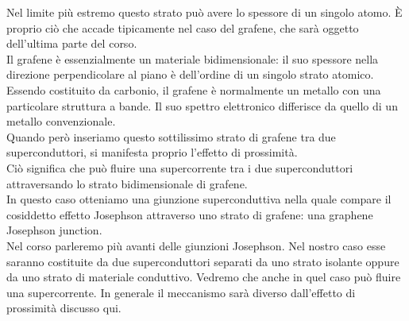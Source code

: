 Nel limite più estremo questo strato può avere lo spessore di un singolo atomo. È proprio ciò che accade tipicamente nel caso del grafene, che sarà oggetto dell'ultima parte del corso.\\
Il grafene è essenzialmente un materiale bidimensionale: il suo spessore nella direzione perpendicolare al piano è dell'ordine di un singolo strato atomico.\\
Essendo costituito da carbonio, il grafene è normalmente un metallo con una particolare struttura a bande. Il suo spettro elettronico differisce da quello di un metallo convenzionale.\\
Quando però inseriamo questo sottilissimo strato di grafene tra due superconduttori, si manifesta proprio l'effetto di prossimità.\\
Ciò significa che può fluire una supercorrente tra i due superconduttori attraversando lo strato bidimensionale di grafene.\\
In questo caso otteniamo una giunzione superconduttiva nella quale compare il cosiddetto effetto Josephson attraverso uno strato di grafene: una graphene Josephson junction.\\
Nel corso parleremo più avanti delle giunzioni Josephson. Nel nostro caso esse saranno costituite da due superconduttori separati da uno strato isolante oppure da uno strato di materiale conduttivo. Vedremo che anche in quel caso può fluire una supercorrente. In generale il meccanismo sarà diverso dall'effetto di prossimità discusso qui.
